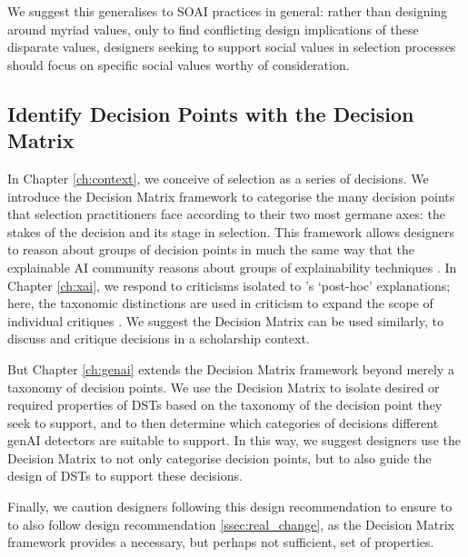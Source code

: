 We suggest this generalises to SOAI practices in general: rather than designing around myriad values, only to find conflicting design implications of these disparate values, designers seeking to support social values in selection processes should focus on specific social values worthy of consideration.

\subsection{Identify Decision Points with the Decision Matrix}
In Chapter \ref{ch:context}, we conceive of selection as a series of decisions. We introduce the Decision Matrix framework to categorise the many decision points that selection practitioners face according to their two most germane axes: the stakes of the decision and its stage in selection. This framework allows designers to reason about groups of decision points in much the same way that the explainable AI community reasons about groups of explainability techniques \cite{ford_play_2020,kumar_problems_2020,doshi-velez_towards_2017,friedrich_taxonomy_2011,molnar_interpretable_2019}. In Chapter \ref{ch:xai}, we respond to criticisms isolated to \textcite{friedrich_taxonomy_2011}'s `post-hoc' explanations; here, the taxonomic distinctions are used in criticism to expand the scope of individual critiques \cite{barocas_hidden_2020,kumar_problems_2020}. We suggest the Decision Matrix can be used similarly, to discuss and critique decisions in a scholarship context.

But Chapter \ref{ch:genai} extends the Decision Matrix framework beyond merely a taxonomy of decision points. We use the Decision Matrix to isolate desired or required properties of DSTs based on the taxonomy of the decision point they seek to support, and to then determine which categories of decisions different genAI detectors are suitable to support. In this way, we suggest designers use the Decision Matrix to not only categorise decision points, but to also guide the design of DSTs to support these decisions.

Finally, we caution designers following this design recommendation to ensure to to also follow design recommendation \ref{ssec:real_change}, as the Decision Matrix framework provides a necessary, but perhaps not sufficient, set of properties.

